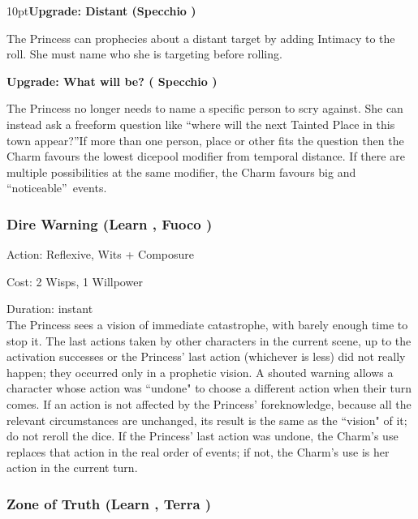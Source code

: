 \begin{myindentpar}{10pt}\textbf{Upgrade: Distant (Specchio \textbullet\textbullet\textbullet\textbullet)}

The Princess can prophecies about a distant target by adding Intimacy to the roll. She must name who she is targeting before rolling.

\textbf{Upgrade: What will be? ( Specchio \textbullet\textbullet\textbullet\textbullet\textbullet)}

The Princess no longer needs to name a specific person to scry against. She can instead ask a freeform question like \textquotedblleft where will the next Tainted Place in this town appear?\textquotedblright If more than one person, place or other fits the question then the Charm favours the lowest dicepool modifier from temporal distance. If there are multiple possibilities at the same modifier, the Charm favours big and \textquotedblleft noticeable\textquotedblright\, events. \end{myindentpar}

\subsubsection*{Dire Warning (Learn \textbullet\textbullet\textbullet\textbullet, Fuoco \textbullet\textbullet\textbullet)}

\noindent Action: Reflexive, Wits + Composure

\noindent Cost: 2 Wisps, 1 Willpower

\noindent Duration: instant \\

\noindent The Princess sees a vision of immediate catastrophe, with barely enough time to stop it. The last actions taken by other characters in the current scene, up to the activation successes or the Princess' last action (whichever is less) did not really happen; they occurred only in a prophetic vision. A shouted warning allows a character whose action was \textquotedblleft undone" to choose a different action when their turn comes. If an action is not affected by the Princess' foreknowledge, because all the relevant circumstances are unchanged, its result is the same as the \textquotedblleft vision" of it; do not reroll the dice. If the Princess' last action was undone, the Charm's use replaces that action in the real order of events; if not, the Charm's use is her action in the current turn.

\subsubsection*{Zone of Truth (Learn \textbullet\textbullet\textbullet\textbullet, Terra \textbullet\textbullet\textbullet)}

